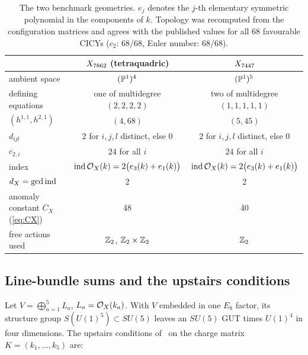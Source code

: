 \begin{table}[t]
\centering
\small
\begin{tabular}{@{}lcc@{}}
\toprule
 & $X_{7862}$ (tetraquadric) & $X_{7447}$ \\
\midrule
ambient space & $(\mathbb{P}^1)^4$ & $(\mathbb{P}^1)^5$ \\
defining equations & one of multidegree $(2,2,2,2)$ & two of multidegree $(1,1,1,1,1)$ \\
$(h^{1,1},h^{2,1})$ & $(4,68)$ & $(5,45)$ \\
$d_{ijl}$ & $2$ for $i,j,l$ distinct, else $0$ & $2$ for $i,j,l$ distinct, else $0$ \\
$c_{2,i}$ & $24$ for all $i$ & $24$ for all $i$ \\
index & $\operatorname{ind}\mathcal{O}_X(k)=2\bigl(e_3(k)+e_1(k)\bigr)$ & $\operatorname{ind}\mathcal{O}_X(k)=2\bigl(e_3(k)+e_1(k)\bigr)$ \\
$d_X=\gcd\operatorname{ind}$ & 2 & 2 \\
anomaly constant $C_X$ (\cref{eq:CX}) & 48 & 40 \\
free actions used & $\mathbb{Z}_2$, $\mathbb{Z}_2\times\mathbb{Z}_2$ & $\mathbb{Z}_2$ \\
\bottomrule
\end{tabular}
\caption{The two benchmark geometries. $e_j$ denotes the $j$-th elementary
symmetric polynomial in the components of $k$. Topology was recomputed from the
configuration matrices and agrees with the published values for all 68
favourable CICYs ($c_2$: 68/68, Euler number: 68/68).}
\label{tab:geometries}
\end{table}

\subsection{Line-bundle sums and the upstairs conditions}

Let $V=\bigoplus_{a=1}^5 L_a$, $L_a=\mathcal{O}_X(k_a)$. With $V$ embedded in one $E_8$
factor, its structure group $S(U(1)^5)\subset SU(5)$ leaves an $SU(5)$ GUT times
$U(1)^4$ in four dimensions. The upstairs conditions
of~\cite{ACGLP2013} on the charge matrix $K=(k_1,\dots,k_5)$ are:

